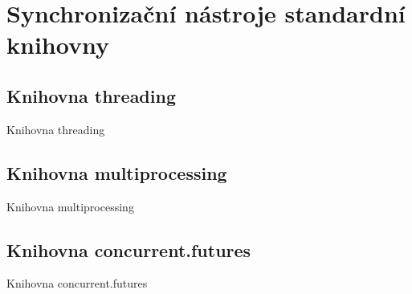 \documentclass{beamer}
\begin{document}


\section{Synchronizační nástroje standardní knihovny}
\subsection{Knihovna threading}
\begin{frame}{Knihovna threading}


\end{frame}

\subsection{Knihovna multiprocessing}
\begin{frame}{Knihovna multiprocessing}

\end{frame}

\subsection{Knihovna concurrent.futures}
\begin{frame}{Knihovna concurrent.futures}

\end{frame}
\end{document}
